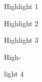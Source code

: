 \documentclass[12pt]{article}
\begin{document}
\newpage
Highlight 1 \par

\newpage
Highlight 2 \par

\newpage
Highlight 3 \par

\newpage
High- \par

\newpage
light 4 \par

 
\end{document}

